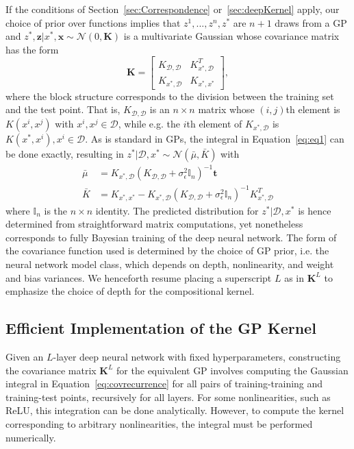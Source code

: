 \documentclass{article} %
\newcommand{\mb}{\mathbf}
\begin{document}
If the conditions of Section~\ref{sec:Correspondence} or~\ref{sec:deepKernel} apply, our choice of prior over functions implies that $z^1, ..., z^n, z^{*}$ are $n+1$ draws from a GP and $z^{*}, \bm{z} | x^{*}, \bm{x} \sim \mathcal{N}(0, \mathbf{K})$ is a multivariate Gaussian whose covariance matrix has the form 
 \[
\mathbf{K} = \begin{bmatrix}
   K_{\mathcal{D}, \mathcal{D}}  & K_{x^{*},\mathcal{D}}^{T}  \\
   K_{x^{*}, \mathcal{D}} & K_{x^{*}, x^{*}}
\end{bmatrix},
\]
where the block structure corresponds to the division between the training set and the test point. That is, $K_{\mathcal{D}, \mathcal{D}}$ is an $n \times n$ matrix whose $(i,j)$th element is $K(x^{i}, x^{j})$ with $x^{i}, x^{j} \in \mathcal{D}$, while e.g. the $i$th element of $K_{x^*, \mathcal{D}}$ is $K(x^*, x^{i}), x^{i} \in \mathcal{D}$. As is standard in GPs, the integral in Equation~\ref{eq:eq1} can be done exactly, resulting in $z^{*} | \mathcal{D}, x^{*} \sim \mathcal{N}(\bar{\mu}, \bar{K})$ with 
\begin{align}
\bar{\mu} &= K_{x^{*}, \mathcal{D}} (K_{\mathcal{D}, \mathcal{D}} + \sigma^2_{\epsilon} \mathbb{I}_{n})^{-1} \bm{t} \label{eq:gp_mean}\\
\bar{K} &= K_{x^{*}, x^{*}} - K_{x^{*}, \mathcal{D}} (K_{\mathcal{D}, \mathcal{D}} + \sigma^2_{\epsilon} \mathbb{I}_{n})^{-1} K^{T}_{x^{*}, \mathcal{D}}
\label{eq:gp_var}
\end{align}
where $\mathbb{I}_{n}$ is the $n \times n$ identity. The predicted distribution for $z^{*} | \mathcal{D}, x^{*}$ is hence determined from straightforward matrix computations, yet nonetheless corresponds to fully Bayesian training of the deep neural network. The form of the covariance function used is determined by the choice of GP prior, i.e. the neural network model class, which depends on depth, nonlinearity, and weight and bias variances. We henceforth resume placing a superscript $L$ as in $\mathbf{K}^{L}$ to emphasize the choice of depth for the compositional kernel.



\subsection{Efficient Implementation of the GP Kernel}
\label{sec:implmentation}

Given an $L$-layer deep neural network with fixed hyperparameters, 
constructing the covariance matrix $\mb K^{L}$ for the equivalent GP involves computing the Gaussian integral in Equation~\ref{eq:covrecurrence} for all pairs of training-training and training-test points, recursively for all layers. 
For some nonlinearities, such as ReLU,
this integration can be done analytically. 
However, to compute the kernel corresponding to arbitrary nonlinearities, the integral must be performed numerically.
\end{document}
